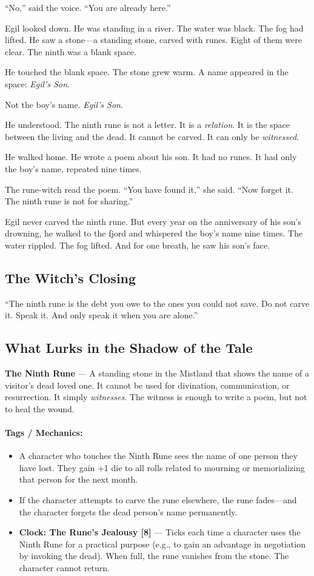 \documentclass[9pt,a5paper]{extbook}
\begin{document}
``No,'' said the voice. ``You are already here.''

Egil looked down. He was standing in a river. The water was black. The fog had lifted. He saw a stone---a standing stone, carved with runes. Eight of them were clear. The ninth was a blank space.

He touched the blank space. The stone grew warm. A name appeared in the space: \textit{Egil's Son}.

Not the boy's name. \textit{Egil's Son}.

He understood. The ninth rune is not a letter. It is a \textit{relation}. It is the space between the living and the dead. It cannot be carved. It can only be \textit{witnessed}.

He walked home. He wrote a poem about his son. It had no runes. It had only the boy's name, repeated nine times.

The rune-witch read the poem. ``You have found it,'' she said. ``Now forget it. The ninth rune is not for sharing.''

Egil never carved the ninth rune. But every year on the anniversary of his son's drowning, he walked to the fjord and whispered the boy's name nine times. The water rippled. The fog lifted. And for one breath, he saw his son's face.

\subsection*{The Witch's Closing}

``The ninth rune is the debt you owe to the ones you could not save. Do not carve it. Speak it. And only speak it when you are alone.''

\subsection*{What Lurks in the Shadow of the Tale}

\textbf{The Ninth Rune} --- A standing stone in the Mistland that shows the name of a visitor's dead loved one. It cannot be used for divination, communication, or resurrection. It simply \textit{witnesses}. The witness is enough to write a poem, but not to heal the wound.

\paragraph{Tags / Mechanics:}
\begin{itemize}
    \item A character who touches the Ninth Rune sees the name of one person they have lost. They gain +1 die to all rolls related to mourning or memorializing that person for the next month.
    \item If the character attempts to carve the rune elsewhere, the rune fades---and the character forgets the dead person's name permanently.
    \item \textbf{Clock: The Rune's Jealousy [8]} --- Ticks each time a character uses the Ninth Rune for a practical purpose (e.g., to gain an advantage in negotiation by invoking the dead). When full, the rune vanishes from the stone. The character cannot return.
\end{itemize}
\end{document}
